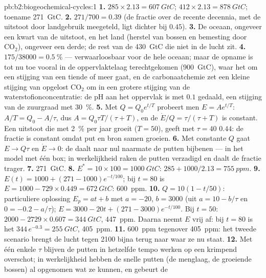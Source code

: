 \begin{solution}{pb:b2:biogeochemical-cycles:1}
\textbf{1.} $285\times 2.13 = \qty{607}{GtC}$; $412\times 2.13 =
\qty{878}{GtC}$; toename \qty{271}{GtC}.
\textbf{2.} $271/700 = 0.39$ (de fractie over de recente decennia,
met de uitstoot door landgebruik meegeteld, ligt dichter bij $0.45$).
\textbf{3.} De oceaan, ongeveer een kwart van de uitstoot, en het land
(herstel van bossen en bemesting door $\mathrm{CO_2}$), ongeveer een derde; de
rest van de \qty{430}{GtC} die niet in de lucht zit.
\textbf{4.} $175/38000 = \qty{0.5}{\%}$ --- verwaarloosbaar voor de hele
oceaan; maar de opname is tot nu toe vooral in de oppervlaktelaag terechtgekomen
(\qty{900}{GtC}), waar het om een stijging van een tiende of meer gaat, en de
carbonaatchemie zet een kleine stijging van opgelost $\mathrm{CO_2}$ om in een
grotere stijging van de waterstofionconcentratie: de pH aan het oppervlak is
met $0.1$ gedaald, een stijging van de zuurgraad met \qty{30}{\%}.
\textbf{5.} Met $Q = Q_0 e^{t/T}$ probeert men $E = Ae^{t/T}$: $A/T = Q_0 -
A/\tau$, dus $A = Q_0\tau T/(\tau + T)$, en de 
$\dot E/Q = \tau/(\tau + T)$ is constant. Een uitstoot die met
\qty{2}{\%} per jaar groeit ($T = 50$), geeft met $\tau = 40$ $0.44$: de
fractie is constant omdat put en bron samen groeien.
\textbf{6.} Met constante $Q$ gaat $E \to Q\tau$ en $\dot E \to 0$: de
 daalt naar nul naarmate de putten bijbenen --- in
het model met één box; in werkelijkheid raken de putten verzadigd en daalt de
fractie trager.
\textbf{7.} \qty{271}{GtC}.
\textbf{8.} $E^{*} = 10\times 100 = \qty{1000}{GtC}$: $285 +
1000/2.13 = \qty{755}{ppm}$.
\textbf{9.} $E(t) = 1000 + (271 - 1000)e^{-t/100}$; bij $t = 80$ is
$E = 1000 - 729\times 0.449 = \qty{672}{GtC}$: \qty{600}{ppm}.
\textbf{10.} $Q = 10(1 - t/50)$: particuliere oplossing $E_p = at + b$
met $a = -20$, $b = 3000$ (uit $a = 10 - b/\tau$ en $0 = -0.2 -
a/\tau$); $E = 3000 - 20t + (271 - 3000)e^{-t/100}$. Bij $t = 50$:
$2000 - 2729\times 0.607 = \qty{344}{GtC}$, \qty{447}{ppm}. Daarna neemt $E$
vrij af: bij $t = 80$ is het $344\,e^{-0.3} = \qty{255}{GtC}$,
\qty{405}{ppm}.
\textbf{11.} \qty{600}{ppm} tegenover \qty{405}{ppm}: het tweede
scenario brengt de lucht tegen 2100 bijna terug naar waar ze nu staat.
\textbf{12.} Met één enkele $\tau$ blijven de putten in hetzelfde tempo werken
op een krimpend overschot; in werkelijkheid hebben de snelle putten (de
menglaag, de groeiende bossen) al opgenomen wat ze kunnen, en gebeurt de

\end{solution}
